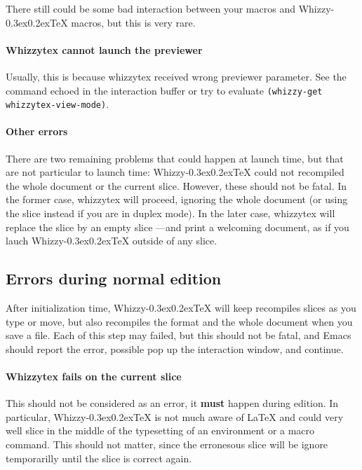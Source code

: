 \documentclass{article}
\makeatletter
\let \lst \verb
\def \whizzy {{Whizzy\kern -0.3ex\raise 0.2ex\hbox{\let \@\relax\TeX}}}
\makeatother
\begin{document}
There still could be some bad interaction between your macros and {\whizzy}
macros, but this is very rare.

\paragraph {Whizzytex cannot launch the previewer}

Usually, this is because whizzytex received wrong previewer parameter.  See
the command echoed in the interaction buffer or try to evaluate
\lst"(whizzy-get whizzytex-view-mode)".

\paragraph {Other errors}

There are two remaining problems that could happen at launch time, but that
are not particular to launch time: {\whizzy} could not recompiled the whole 
document or the current slice. However, these should not be fatal. 
In the former case, whizzytex will proceed, ignoring the whole document 
(or using the slice instead if you are in duplex mode). In the later case,
whizzytex will replace the slice by an empty slice ---and print a welcoming
document, as if you lauch {\whizzy} outside of any slice. 

\subsection {Errors during normal edition}

After initialization time, {\whizzy} will keep recompiles slices as you
type or move, but also recompiles the format and the whole document when you
save a file. Each of this step may failed, but this should not be fatal, and
Emacs should report the error, possible pop up the interaction window, and
continue. 

\paragraph {Whizzytex fails on the current slice}

This should not be considered as an error, it {\bf must} happen during
edition. In particular, {\whizzy} is not much aware of {\LaTeX} and could
very well slice in the middle of the typesetting of an environment or a
macro command. This should not matter, since the erronesous slice will be
ignore temporarilly until the slice is correct again.
\end{document}
